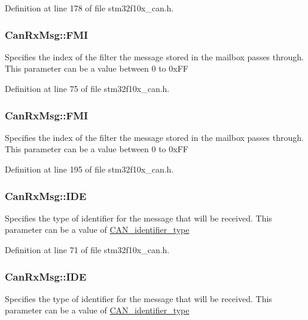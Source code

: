 Definition at line 178 of file stm32f10x\+\_\+can.\+h.

\subsubsection[{\texorpdfstring{F\+MI}{FMI}}]{ Can\+Rx\+Msg\+::\+F\+MI}\hypertarget{struct_can_rx_msg_abe3f86b0e9ff56fe0e7b0af915a93425}{}\label{struct_can_rx_msg_abe3f86b0e9ff56fe0e7b0af915a93425}
Specifies the index of the filter the message stored in the mailbox passes through. This parameter can be a value between 0 to 0x\+FF 

Definition at line 75 of file stm32f10x\+\_\+can.\+h.

\subsubsection[{\texorpdfstring{F\+MI}{FMI}}]{ Can\+Rx\+Msg\+::\+F\+MI}\hypertarget{struct_can_rx_msg_a5afe39d8e295659eeb3030593828b96a}{}\label{struct_can_rx_msg_a5afe39d8e295659eeb3030593828b96a}
Specifies the index of the filter the message stored in the mailbox passes through. This parameter can be a value between 0 to 0x\+FF 

Definition at line 195 of file stm32f10x\+\_\+can.\+h.

\subsubsection[{\texorpdfstring{I\+DE}{IDE}}]{ Can\+Rx\+Msg\+::\+I\+DE}\hypertarget{struct_can_rx_msg_a31cfd2e1bc0d038119b4a57eac635dfe}{}\label{struct_can_rx_msg_a31cfd2e1bc0d038119b4a57eac635dfe}
Specifies the type of identifier for the message that will be received. This parameter can be a value of \hyperlink{group___c_a_n__identifier__type}{C\+A\+N\+\_\+identifier\+\_\+type} 

Definition at line 71 of file stm32f10x\+\_\+can.\+h.

\subsubsection[{\texorpdfstring{I\+DE}{IDE}}]{ Can\+Rx\+Msg\+::\+I\+DE}\hypertarget{struct_can_rx_msg_a83a67d1a709cc01570ce956e5adc811f}{}\label{struct_can_rx_msg_a83a67d1a709cc01570ce956e5adc811f}
Specifies the type of identifier for the message that will be received. This parameter can be a value of \hyperlink{group___c_a_n__identifier__type}{C\+A\+N\+\_\+identifier\+\_\+type} 

